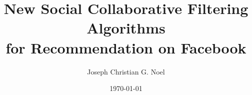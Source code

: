 \documentclass[11pt]{book}
\title{New Social Collaborative Filtering Algorithms\\ for Recommendation on Facebook}
\author{Joseph Christian G. Noel}
\date{\today}
\begin{document}
\pagestyle{empty}
\thispagestyle{empty}




\cleardoublepage
\pagestyle{empty}


\cleardoublepage
\pagestyle{empty}


\cleardoublepage
\pagestyle{headings}


\cleardoublepage
\pagestyle{headings}
\tableofcontents

\mainmatter














%

\backmatter

\nocite{ste,lla,glfm,tf,sorec,sr,rrmf,bisim,socinf,matchbox,conitzer-jair-09,jones-jgo-01,bonilla-et-al-nips-08,kamishima-kdd-03,huang-guestrin-nips-09,birlutiu-et-al-neuro-10,chu-Ghahramani-icml-05,chu-Ghahramani-jmlr-05,brochu-et-al-nips-08,yu-et-al-icml-05,howard-ieee-66,chajewska-et-al-aaai-00,guo-sanner-aistats-10,candela-rasmussen-jmlr-05,boutilier02239,Chajewska00utilitiesas,conitzer09161,viappiani09Regret-basedOptimalRecommendationSetsConversational,bradley52324}




\printindex
\end{document}
